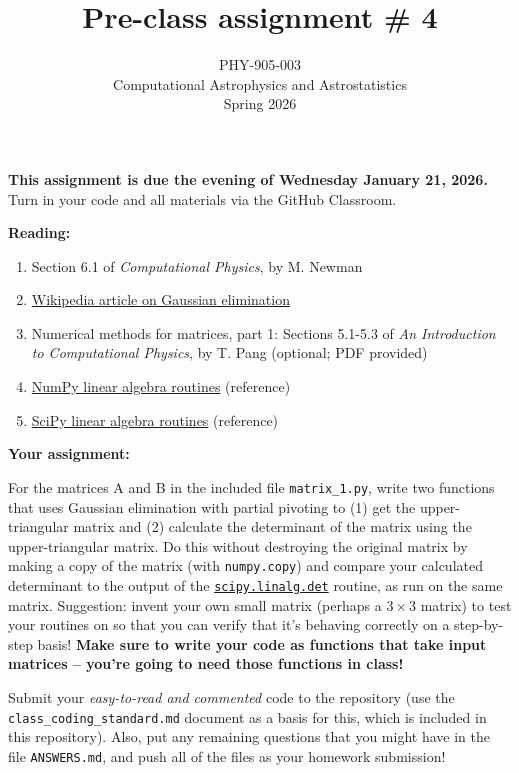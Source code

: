 \documentclass[10pt]{article}
\title{Pre-class assignment \# 4}
\author{PHY-905-003\\Computational Astrophysics and
  Astrostatistics\\Spring 2026}
\date{} %
\begin{document}
 
\maketitle

\vspace{-5mm}

\noindent
\textbf{This assignment is due the evening of Wednesday January 21, 2026.}
 Turn in your code and all materials via the GitHub Classroom.

\vspace{5mm}

\noindent
\textbf{Reading:}

\begin{enumerate}

\item Section 6.1 of \textit{Computational Physics}, by M. Newman 

\item 
  \href{https://en.wikipedia.org/wiki/Gaussian_elimination}{Wikipedia article
    on Gaussian elimination} 

\item Numerical methods for matrices, part 1: Sections 5.1-5.3  of \textit{An Introduction to Computational Physics},
  by T. Pang (optional; PDF provided)

\item 
  \href{https://docs.scipy.org/doc/numpy/reference/routines.linalg.html}{NumPy
  linear algebra routines}  (reference)

\item 
  \href{https://docs.scipy.org/doc/scipy/reference/linalg.html}{SciPy
  linear algebra routines}  (reference)

\end{enumerate}

\noindent
\textbf{Your assignment:}  
\vspace{3mm}

For the matrices A and B in the included
file \texttt{matrix\_1.py}, write two functions that uses Gaussian
elimination with partial pivoting to (1) get the upper-triangular
matrix and (2) calculate the determinant of the matrix using the
upper-triangular matrix.  Do this without destroying the original
matrix by making a copy of the matrix (with \texttt{numpy.copy}) and
compare your calculated determinant to the output of the
\href{https://docs.scipy.org/doc/scipy/reference/generated/scipy.linalg.det.html#scipy.linalg.det}{\texttt{scipy.linalg.det}}
  routine, as run on the same matrix.  Suggestion: invent your own
  small matrix (perhaps a $3 \times 3$ matrix) to test your routines on so that
  you can verify that it's behaving correctly on a step-by-step basis!
  \textbf{Make sure to write your code as functions that take input
    matrices -- you're going to need those functions in class!}


Submit your \textit{easy-to-read and commented} code to the
repository (use the \texttt{class\_coding\_standard.md} document as a
basis for this, which is included in this repository).  Also, put any remaining questions that you might have 
 in the file \texttt{ANSWERS.md}, and push all of the files as your
 homework submission!
\end{document}
